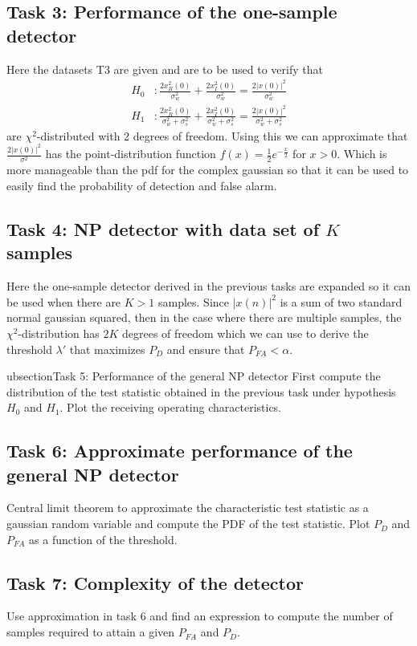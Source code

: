 \subsection{Task 3: Performance of the one-sample detector}
Here the datasets T3 are given and are to be used to verify that
\begin{align}
	H_0 &: \frac{2x_R^2(0)}{\sigma_w^2}+\frac{2x_I^2(0)}{\sigma_w^2}=\frac{2|x(0)|^2}{\sigma_w^2}\label{eq:chi_sq_h0}\\
	H_1 &: \frac{2x_R^2(0)}{\sigma_w^2+\sigma_s^2}+\frac{2x_I^2(0)}{\sigma_w^2+\sigma_s^2}=\frac{2|x(0)|^2}{\sigma_w^2+\sigma_s^2}\label{eq:chi_sq_h1}
\end{align}
are $\chi^2$-distributed with 2 degrees of freedom. Using this we can approximate that $\frac{2|x(0)|^2}{\sigma^2}$ has the point-distribution function $f(x) = \frac{1}{2}e^{-\frac{x}{2}}$ for $x>0$. Which is more manageable than the pdf for the complex gaussian so that it can be used to easily find the probability of detection and false alarm.

\subsection{Task 4: NP detector with data set of $K$ samples}
Here the one-sample detector derived in the previous tasks are expanded so it can be used when there are $K>1$ samples. Since $|x(n)|^2$ is a sum of two standard normal gaussian squared, then in the case where there are multiple samples, the $\chi^2$-distribution has $2K$ degrees of freedom which we can use to derive the threshold $\lambda'$ that maximizes $P_D$ and ensure that $P_{FA}<\alpha$.

ubsection{Task 5: Performance of the general NP detector}
First compute the distribution of the test statistic obtained in the previous task under hypothesis $H_0$ and $H_1$. Plot the receiving operating characteristics.

\subsection{Task 6: Approximate performance of the general NP detector}
Central limit theorem to approximate the characteristic test statistic as a gaussian random variable and compute the PDF of the test statistic. Plot $P_D$ and $P_{FA}$ as a function of the threshold.

\subsection{Task 7: Complexity of the detector}
Use approximation in task 6 and find an expression to compute the number of samples required to attain a given $P_{FA}$ and $P_D$.


